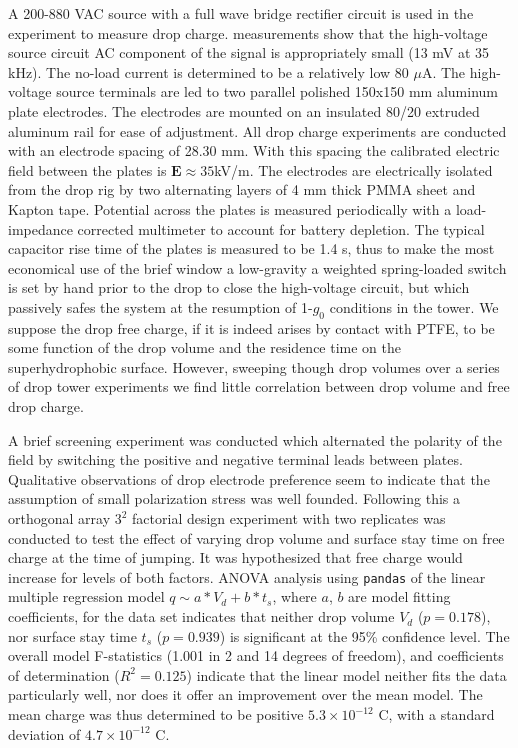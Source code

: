 \documentclass[12pt,a4paper,oneside]{book}
\begin{document}
A 200-880 VAC source with a full wave bridge rectifier circuit is used in the experiment to measure drop charge.  measurements show that the high-voltage source circuit AC component of the signal is appropriately small (13 mV at 35 kHz). The no-load current is determined to be a relatively low 80 $\mu$A. The high-voltage source terminals are led to two parallel polished 150x150 mm aluminum plate electrodes. The electrodes are mounted on an insulated 80/20 extruded aluminum rail for ease of adjustment. All drop charge experiments are conducted with an electrode spacing of 28.30 mm. With this spacing the calibrated electric field between the plates is $\mathbf{E} \approx 35$kV/m. The electrodes are electrically isolated from the drop rig by two alternating layers of 4 mm thick PMMA sheet and Kapton tape. Potential across the plates is measured periodically with a load-impedance corrected multimeter to account for battery depletion. The typical capacitor rise time of the plates is measured to be 1.4 s, thus to make the most economical use of the brief window a low-gravity a weighted spring-loaded switch is set by hand prior to the drop to close the high-voltage circuit, but which passively safes the system at the resumption of 1-$g_0$ conditions in the tower. We suppose the drop free charge, if it is indeed arises by contact with PTFE, to be some function of the drop volume and the residence time on the superhydrophobic surface. However, sweeping though drop volumes over a series of drop tower experiments we find little correlation between drop volume  and free drop charge.

A brief screening experiment was conducted which alternated the polarity of the field by switching the positive and negative terminal leads between plates. Qualitative observations of drop electrode preference seem to indicate that the assumption of small polarization stress was well founded. Following this a orthogonal array $3^2$ factorial design experiment with two replicates was conducted to test the effect of varying drop volume and surface stay time on free charge at the time of jumping. It was hypothesized that free charge would increase for levels of both factors. ANOVA analysis using \verb|pandas| of the linear multiple regression model $q \sim a*V_d + b*t_s$, where $a$, $b$ are model fitting coefficients, for the data set indicates that neither drop volume $V_d$ ($p=0.178$), nor surface stay time $t_s$ ($p=0.939$) is significant at the 95\% confidence level. The overall model F-statistics (1.001 in 2 and 14 degrees of freedom), and coefficients of determination ($R^2 = 0.125$) indicate that the linear model neither fits the data particularly well, nor does it offer an improvement over the mean model. The mean charge was thus determined to be positive $5.3 \times 10^{-12}$ C, with a standard deviation of $4.7 \times 10^{-12}$ C.
\end{document}
